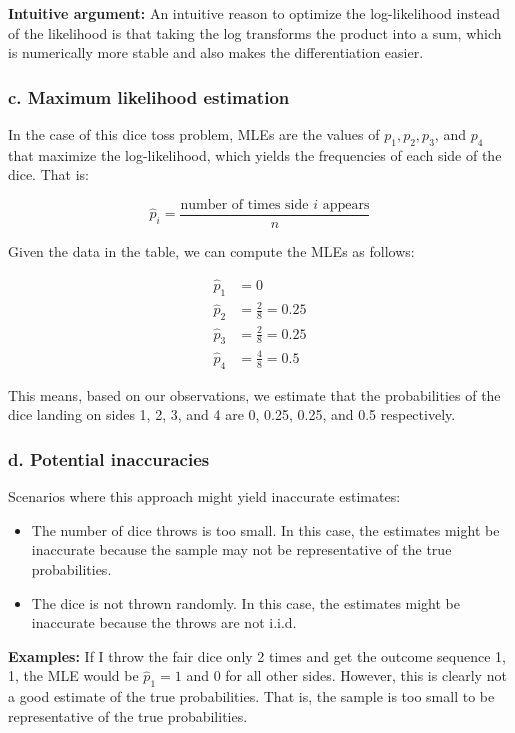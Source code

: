 \documentclass[10pt]{article}
\begin{document}
\textbf{Intuitive argument:} An intuitive reason to optimize the log-likelihood instead of the likelihood is that taking the log transforms the product into a sum, which is numerically more stable and also makes the differentiation easier.


\subsubsection*{c. Maximum likelihood estimation}

In the case of this dice toss problem, MLEs are the values of \(p_1, p_2, p_3\), and \(p_4\) that maximize the log-likelihood, which yields the frequencies of each side of the dice. That is:

\[
\hat{p}_i = \frac{\text{number of times side } i \text{ appears}}{n}
\]

Given the data in the table, we can compute the MLEs as follows:

\begin{align*}
\hat{p}_1 &= 0 \\
\hat{p}_2 &= \frac{2}{8} = 0.25 \\
\hat{p}_3 &= \frac{2}{8} = 0.25 \\
\hat{p}_4 &= \frac{4}{8} = 0.5
\end{align*}

This means, based on our observations, we estimate that the probabilities of the dice landing on sides 1, 2, 3, and 4 are 0, 0.25, 0.25, and 0.5 respectively.

\subsubsection*{d. Potential inaccuracies}

Scenarios where this approach might yield inaccurate estimates:

\begin{itemize}
    \item The number of dice throws is too small. In this case, the estimates might be inaccurate because the sample may not be representative of the true probabilities.
    \item The dice is not thrown randomly. In this case, the estimates might be inaccurate because the throws are not i.i.d.
\end{itemize}

\textbf{Examples:} If I throw the fair dice only 2 times and get the outcome sequence {1, 1}, the MLE would be \(\hat{p}_1 = 1\) and 0 for all other sides. However, this is clearly not a good estimate of the true probabilities. That is, the sample is too small to be representative of the true probabilities.

\printbibliography
\end{document}
